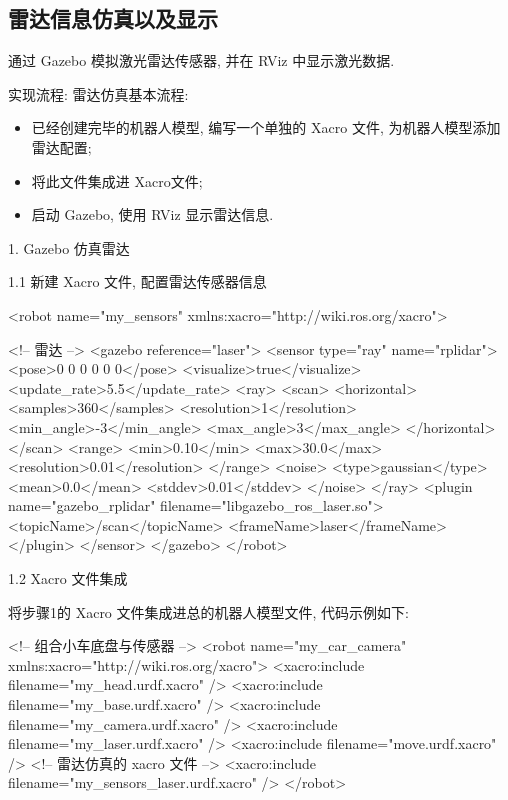 \documentclass[openany, fontset=windowsold]{ctexbook}
\theoremstyle{kaiti}
\theoremstyle{normal}
\begin{document}
\subsection{雷达信息仿真以及显示}

通过 Gazebo 模拟激光雷达传感器, 并在 RViz 中显示激光数据.

实现流程: 雷达仿真基本流程:

\begin{itemize}
  \item 已经创建完毕的机器人模型, 编写一个单独的 Xacro 文件, 为机器人模型添加雷达配置; 
  \item 将此文件集成进 Xacro文件; 
  \item 启动 Gazebo, 使用 RViz 显示雷达信息.
\end{itemize}

1. Gazebo 仿真雷达

1.1 新建 Xacro 文件, 配置雷达传感器信息

\begin{xml}
  <robot name="my_sensors" xmlns:xacro="http://wiki.ros.org/xacro">

    <!-- 雷达 -->
    <gazebo reference="laser">
      <sensor type="ray" name="rplidar">
        <pose>0 0 0 0 0 0</pose>
        <visualize>true</visualize>
        <update_rate>5.5</update_rate>
        <ray>
          <scan>
            <horizontal>
              <samples>360</samples>
              <resolution>1</resolution>
              <min_angle>-3</min_angle>
              <max_angle>3</max_angle>
            </horizontal>
          </scan>
          <range>
            <min>0.10</min>
            <max>30.0</max>
            <resolution>0.01</resolution>
          </range>
          <noise>
            <type>gaussian</type>
            <mean>0.0</mean>
            <stddev>0.01</stddev>
          </noise>
        </ray>
        <plugin name="gazebo_rplidar" filename="libgazebo_ros_laser.so">
          <topicName>/scan</topicName>
          <frameName>laser</frameName>
        </plugin>
      </sensor>
    </gazebo>
  </robot>
\end{xml}

1.2 Xacro 文件集成

将步骤1的 Xacro 文件集成进总的机器人模型文件, 代码示例如下:

\begin{xml}
  <!-- 组合小车底盘与传感器 -->
  <robot name="my_car_camera" xmlns:xacro="http://wiki.ros.org/xacro">
      <xacro:include filename="my_head.urdf.xacro" />
      <xacro:include filename="my_base.urdf.xacro" />
      <xacro:include filename="my_camera.urdf.xacro" />
      <xacro:include filename="my_laser.urdf.xacro" />
      <xacro:include filename="move.urdf.xacro" />
      <!-- 雷达仿真的 xacro 文件 -->
      <xacro:include filename="my_sensors_laser.urdf.xacro" />
  </robot>
\end{xml}
\end{document}
